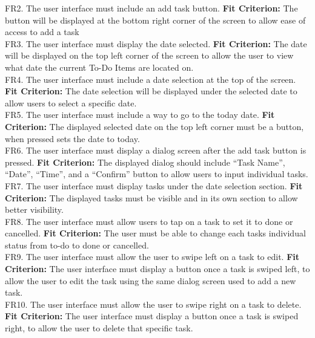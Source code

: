 \documentclass[12pt, titlepage]{article}
\begin{document}
\noindent FR2. The user interface must include an add task button.
	\textbf{Fit Criterion:} The button will be displayed at the bottom right corner of the screen to 
allow ease of access to add a task\\

\noindent FR3. The user interface must display the date selected.
	\textbf{Fit Criterion:} The date will be displayed on the top left corner of the screen to allow the 
user to view what date the current To-Do Items are located on.\\

\noindent FR4. The user interface must include a date selection at the top of the screen.
	\textbf{Fit Criterion:} The date selection will be displayed under the selected date to allow users 
to select a specific date.\\

\noindent FR5. The user interface must include a way to go to the today date.
	\textbf{Fit Criterion:} The displayed selected date on the top left corner must be a button, when 
pressed sets the date to today.\\

\noindent FR6. The user interface must display a dialog screen after the add task button is pressed.
	\textbf{Fit Criterion:} The displayed dialog should include “Task Name”, “Date”, “Time”, and a 
“Confirm” button to allow users to input individual tasks.\\

\noindent FR7. The user interface must display tasks under the date selection section.
	\textbf{Fit Criterion:} The displayed tasks must be visible and in its own section to allow better 
visibility.\\

\noindent FR8. The user interface must allow users to tap on a task to set it to done or cancelled.
	\textbf{Fit Criterion:} The user must be able to change each tasks individual status from to-do to 
done or cancelled. \\

\noindent FR9. The user interface must allow the user to swipe left on a task to edit.
	\textbf{Fit Criterion:} The user interface must display a button once a task is swiped left, to 
allow the user to edit the task using the same dialog screen used to add a new task.\\

\noindent FR10. The user interface must allow the user to swipe right on a task to delete.
	\textbf{Fit Criterion:} The user interface must display a button once a task is swiped right, to 
allow the user to delete that specific task.\\
\end{document}
